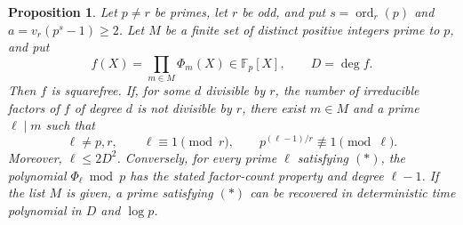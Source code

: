 \documentclass[11pt]{article}
\newtheorem{proposition}[theorem]{Proposition}
\theoremstyle{definition}
\theoremstyle{remark}
\begin{document}
\begin{proposition}\label{prop:cyclotomic-count}
Let $p\ne r$ be primes, let $r$ be odd, and put
$s=\operatorname{ord}_r(p)$ and $a=v_r(p^s-1)\ge2$.
Let $M$ be a finite set of distinct positive integers prime to $p$, and put
\[
 f(X)=\prod_{m\in M}\Phi_m(X)\in\mathbb F_p[X],
 \qquad D=\deg f.
\]
Then $f$ is squarefree.  If, for some $d$ divisible by $r$, the number of
irreducible factors of $f$ of degree $d$ is not divisible by $r$, there
exist $m\in M$ and a prime $\ell\mid m$ such that
\[
 \ell\ne p,r,\qquad \ell\equiv1\pmod r,
 \qquad p^{(\ell-1)/r}\not\equiv1\pmod\ell.
 \tag{\(*\)}
\]
Moreover, $\ell\le2D^2$.
Conversely, for every prime $\ell$ satisfying \textup{\((*)\)}, the
polynomial $\Phi_\ell\bmod p$ has the stated factor-count property and
degree $\ell-1$.
If the list $M$ is given, a prime satisfying \textup{\((*)\)} can be
recovered in deterministic time polynomial in $D$ and $\log p$.
\end{proposition}
\end{document}
